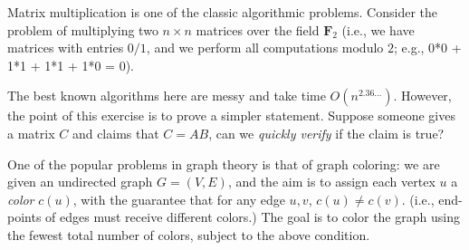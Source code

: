 \documentclass[addpoints]{exam}
\begin{document}
\begin{questions}

Matrix multiplication is one of the classic algorithmic problems.  Consider the problem of multiplying two $n \times n$ matrices over the field $\mathbf{F}_2$ (i.e., we have matrices with entries $0/1$, and we perform all computations modulo $2$; e.g., 0*0 + 1*1 + 1*1 + 1*0 = 0).

The best known algorithms here are messy and take time $O(n^{2.36...})$.  However, the point of this exercise is to prove a simpler statement. Suppose someone gives a matrix $C$ and claims that $C = AB$, can we {\em quickly verify} if the claim is true?


One of the popular problems in graph theory is that of graph coloring: we are given an undirected graph $G = (V, E)$, and the aim is to assign each vertex $u$ a {\em color} $c(u)$, with the guarantee that for any edge $u, v$, $c(u) \ne c(v)$.  (i.e., end-points of edges must receive different colors.) The goal is to color the graph using the fewest total number of colors, subject to the above condition.


\end{questions}
\end{document}
